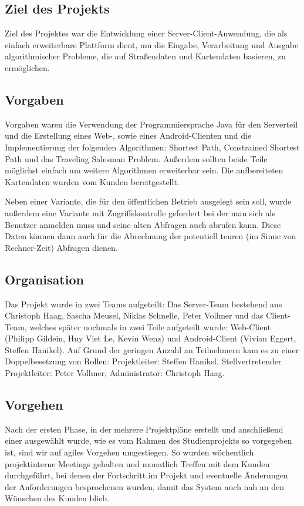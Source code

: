 \subsection*{Ziel des Projekts}

Ziel des Projektes war die Entwicklung einer Server-Client-Anwendung, die als einfach erweiterbare Plattform dient, um die Eingabe, Verarbeitung und Ausgabe algorithmischer Probleme, die auf Straßendaten und Kartendaten basieren, zu ermöglichen.

\subsection*{Vorgaben}

Vorgaben waren die Verwendung der Programmiersprache Java für den Serverteil und die Erstellung eines Web-, sowie eines Android-Clienten und die Implementierung der folgenden Algorithmen: Shortest Path, Constrained Shortest Path und das Traveling Salesman Problem. Außerdem sollten beide Teile möglichst einfach um weitere Algorithmen erweiterbar sein. Die aufbereiteten Kartendaten wurden vom Kunden bereitgestellt.

Neben einer Variante, die für den öffentlichen Betrieb ausgelegt sein soll, wurde außerdem eine Variante mit Zugriffskontrolle gefordert bei der man sich als Benutzer anmelden muss und seine alten Abfragen auch abrufen kann. Diese Daten können dann auch für die Abrechnung der potentiell teuren (im Sinne von Rechner-Zeit) Abfragen dienen.

\subsection*{Organisation}

Das Projekt wurde in zwei Teams aufgeteilt: Das Server-Team bestehend aus Christoph Haag, Sascha Meusel, Niklas Schnelle, Peter Vollmer und das Client-Team, welches später nochmals in zwei Teile aufgeteilt wurde: Web-Client (Philipp Gildein, Huy Viet Le, Kevin Wenz) und Android-Client (Vivian Eggert, Steffen Hanikel). Auf Grund der geringen Anzahl an Teilnehmern kam es zu einer Doppelbesetzung von Rollen: Projektleiter: Steffen Hanikel, Stellvertretender Projektleiter: Peter Vollmer, Administrator: Christoph Haag.

\subsection*{Vorgehen}

Nach der ersten Phase, in der mehrere Projektpläne erstellt und anschließend einer ausgewählt wurde, wie es vom Rahmen des Studienprojekts so vorgegeben ist, sind wir auf agiles Vorgehen umgestiegen. So wurden wöchentlich projektinterne Meetings gehalten und monatlich Treffen mit dem Kunden durchgeführt, bei denen der Fortschritt im Projekt und eventuelle Änderungen der Anforderungen besprochenen wurden, damit das System auch nah an den Wünschen des Kunden blieb.

